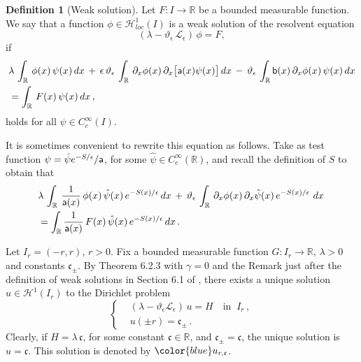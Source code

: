 \documentclass[reqno]{amsart}
\theoremstyle{plain}
\theoremstyle{definition}
\newtheorem{definition}[theorem]{Definition}
\newcommand{\mc}[1]{{\mathcal #1}}
\newcommand{\mf}[1]{{\mathfrak #1}}
\newcommand{\bb}[1]{{\mathbb #1}}
\newcommand{\ms}[1]{{\mathscr #1}}
\newcommand{\mss}[1]{{\textsf #1}}
\newcounter{as}[section]
\newcommand{\<}{\langle}
\renewcommand{\>}{\rangle}
\begin{document}
\begin{definition}[Weak solution]
Let $F\colon I \to \bb R$ be a bounded measurable function. We say that
a function $\phi \in \mc H^1_{loc}(I)$ is a weak solution of the
resolvent equation
\begin{equation}
\label{111}
(\lambda - \vartheta_\epsilon \,\ms L_\epsilon)\,\phi = F,
\end{equation}
if 
\begin{align}
\label{115}
& \lambda\,\int_{\bb R}\,\phi(x)\,\psi(x)\,dx
\,+\, \epsilon\, \vartheta_\epsilon\, \int_{\bb R}\,
\partial_x\phi(x)\,\partial_x\big[ \mss a(x) \psi(x)\big] \,dx\,
- \, \vartheta_\epsilon\,
\int_{\bb R} \mss b(x)\,\partial_x\phi(x)\,\psi(x)\, dx
\notag \\
&= \int_{\bb R}\,F(x)\,\psi(x)\,dx\,,
\end{align}
holds for all $\psi \in C_c^\infty(I)$.
\end{definition}

It is sometimes convenient to rewrite this equation as follows. Take
as test function $\psi = \hat\psi e^{-S/\epsilon} / \mss a$, for some
$\hat \psi \in C_c^{\infty}(\bb R)$, and recall the definition of $S$
to obtain that
\begin{equation}
\label{113}
\begin{aligned}
& \lambda\,\int_{\bb R}\, \frac{1}{\mss a(x)}\,
\phi(x)\,\hat  \psi(x)\, e^{-S(x)/\epsilon}\,
dx
\,+\, \vartheta_\epsilon\, \int_{\bb R}\,
\partial_x\phi(x)\,\partial_x \hat \psi(x)\,  e^{-S(x)/\epsilon}\, \,dx\,
\notag \\
&= \int_{\bb R} \frac{1}{\mss a(x)} \,F(x)\,
\hat \psi(x)\,  e^{-S(x)/\epsilon} \,dx\,.
\end{aligned}
\end{equation}

Let $I_r=(-r,r)$, $r>0$.  Fix a bounded measurable function
$G\colon I_r\to \bb R$, $\lambda>0$ and constants $\mf c_\pm$.  By
Theorem 6.2.3 with $\gamma=0$ and the Remark just after the definition
of weak solutions in Section 6.1 of \cite{le}, there exists a unique
solution $u\in \mc H^1(I_r)$  to the Dirichlet
problem
\begin{equation}
\label{109}
\left\{
\begin{aligned}
& (\lambda - \vartheta_\epsilon \ms L_\epsilon) \, u = H \quad
\text{in}\;\; I_r \,, \\
& u (\pm r) = \mf c_\pm \,.
\end{aligned}
\right.
\end{equation}
Clearly, if $H=\lambda \, \mf c$, for some constant $\mf c\in \bb R$,
and $\mf c_\pm = \mf c$, the unique solution is $u = \mf c$. This solution is
denoted by $\color{blue} u_{r, \mf c}$.
\end{document}
